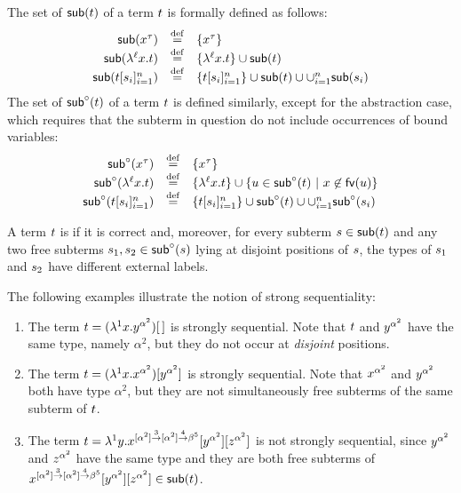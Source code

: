 \begin{definition}
The set of  $\mathsf{sub}(t)$ of a term $t$ is formally defined as follows:
\[
  \begin{array}{rcl}
    \mathsf{sub}(x^\tau) & \overset{\mathrm{def}}{=} & \{x^\tau\} \\
    \mathsf{sub}(\lambda^{\ell} x. t) & \overset{\mathrm{def}}{=} & \{\lambda^{\ell} x. t\} \cup \mathsf{sub}(t) \\
    \mathsf{sub}(t[s_i]_{i=1}^n) & \overset{\mathrm{def}}{=} & \{t[s_i]_{i=1}^n\} \cup \mathsf{sub}(t) \cup \cup_{i=1}^{n} \mathsf{sub}(s_i)
  \end{array}
\]
The set of  $\mathsf{sub}^{\circ}(t)$ of a term $t$ is defined similarly,
except for the abstraction case, which requires that the subterm in question
do not include occurrences of bound variables:
\[
  \begin{array}{rcl}
    \mathsf{sub}^{\circ}(x^\tau) & \overset{\mathrm{def}}{=} & \{x^\tau\} \\
    \mathsf{sub}^{\circ}(\lambda^{\ell} x. t) & \overset{\mathrm{def}}{=} & \{\lambda^{\ell} x. t\} \cup \{u \in \mathsf{sub}^{\circ}(t) \ |\  x \not\in \mathsf{fv}({u})\} \\
    \mathsf{sub}^{\circ}(t[s_i]_{i=1}^n) & \overset{\mathrm{def}}{=} & \{t[s_i]_{i=1}^n\} \cup \mathsf{sub}^{\circ}(t) \cup \cup_{i=1}^{n} \mathsf{sub}^{\circ}(s_i)
  \end{array}
\]
\end{definition}

\begin{definition}
A term $t$ is 
if it is correct and, moreover,
for every subterm $s \in \mathsf{sub}(t)$
and any two free subterms $s_1,s_2 \in \mathsf{sub}^{\circ}(s)$ lying at disjoint positions of $s$,
the types of $s_1$ and $s_2$ have different external labels.
\end{definition}

\begin{example}
The following examples illustrate the notion of strong sequentiality:
\begin{enumerate}
\item The term $t = (\lambda^{1} x. y^{\alpha^2})[\,]$ is strongly sequential.
      Note that $t$ and $y^{\alpha^2}$ have the same type, namely $\alpha^2$,
      but they do not occur at {\em disjoint} positions.
\item The term $t = (\lambda^{1} x. x^{\alpha^2})[y^{\alpha^2}]$ is strongly sequential.
      Note that $x^{\alpha^2}$ and $y^{\alpha^2}$ both have type $\alpha^2$,
      but they are not simultaneously free subterms of the same subterm of $t$.
\item The term $t = \lambda^{1} y.  x^{[\alpha^2] \overset{3}{\to} [\alpha^2] \overset{4}{\to} \beta^5} [y^{\alpha^2}] [z^{\alpha^2}]$
      is not strongly sequential,
      since $y^{\alpha^2}$ and $z^{\alpha^2}$
      have the same type and they are both free subterms of
      $x^{[\alpha^2] \overset{3}{\to} [\alpha^2] \overset{4}{\to} \beta^5} [y^{\alpha^2}] [z^{\alpha^2}] \in \mathsf{sub}(t)$.
\end{enumerate}
\end{example}

